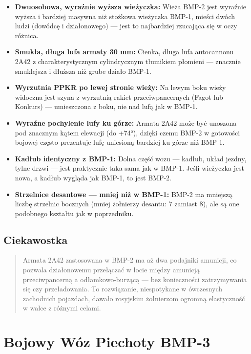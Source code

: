 \documentclass[12pt,openany,oneside]{book}
\providecommand{\tightlist}{%
  \setlength{\itemsep}{0pt}\setlength{\parskip}{0pt}}
\begin{document}
\begin{itemize}
\tightlist
\item
  \textbf{Dwuosobowa, wyraźnie wyższa wieżyczka:} Wieża BMP-2 jest
  wyraźnie wyższa i bardziej masywna niż stożkowa wieżyczka BMP-1,
  mieści dwóch ludzi (dowódcę i działonowego) --- jest to najbardziej
  rzucająca się w oczy różnica.
\item
  \textbf{Smukła, długa lufa armaty 30 mm:} Cienka, długa lufa
  autocannonu 2A42 z charakterystycznym cylindrycznym tłumikiem płomieni
  --- znacznie smuklejsza i dłuższa niż grube działo BMP-1.
\item
  \textbf{Wyrzutnia PPKR po lewej stronie wieży:} Na lewym boku wieży
  widoczna jest szyna z wyrzutnią rakiet przeciwpancernych (Fagot lub
  Konkurs) --- umieszczona z boku, nie nad lufą jak w BMP-1.
\item
  \textbf{Wyraźne pochylenie lufy ku górze:} Armata 2A42 może być
  unoszona pod znacznym kątem elewacji (do +74°), dzięki czemu BMP-2 w
  gotowości bojowej często prezentuje lufę uniesioną bardziej ku górze
  niż BMP-1.
\item
  \textbf{Kadłub identyczny z BMP-1:} Dolna część wozu --- kadłub, układ
  jezdny, tylne drzwi --- jest praktycznie taka sama jak w BMP-1. Jeśli
  wieżyczka jest nowa, a kadłub wygląda jak BMP-1, to jest BMP-2.
\item
  \textbf{Strzelnice desantowe --- mniej niż w BMP-1:} BMP-2 ma mniejszą
  liczbę strzelnic bocznych (mniej żołnierzy desantu: 7 zamiast 8), ale
  są one podobnego kształtu jak w poprzedniku.
\end{itemize}

\section{Ciekawostka}\label{ciekawostka-4}

\begin{quote}
Armata 2A42 zastosowana w BMP-2 ma aż dwa podajniki amunicji, co pozwala
działonowemu przełączać w locie między amunicją przeciwpancerną a
odłamkowo-burzącą --- bez konieczności zatrzymywania się czy
przeładowania. To rozwiązanie, niespotykane w ówczesnych zachodnich
pojazdach, dawało rosyjskim żołnierzom ogromną elastyczność w walce z
różnymi celami.
\end{quote}

\chapter{Bojowy Wóz Piechoty BMP-3}\label{bojowy-wuxf3z-piechoty-bmp-3}
\end{document}

